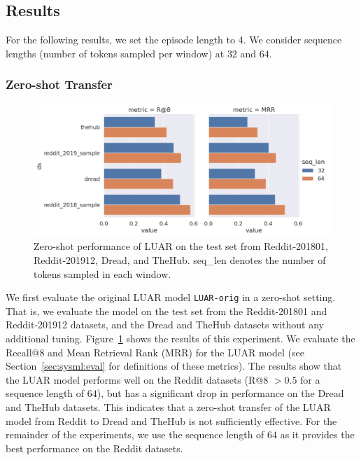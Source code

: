 \subsection{Results}

For the following results, we set the episode length to 4. We consider sequence lengths (number of tokens sampled per window) at $32$ and $64$.

\subsubsection{Zero-shot Transfer}
\begin{figure}
    \centering
    \includegraphics[width=0.9\linewidth]{stylometryExtensions/figures/results/rq1_zeroshot} 
    \caption{Zero-shot performance of LUAR on the test set from Reddit-201801, Reddit-201912, Dread, and TheHub. seq\_len denotes the number of tokens sampled in each window.}
    \label{fig:stylometry_extensions:followingTrail:results:rq1_zeroshot}   
\end{figure}
We first evaluate the original LUAR model \texttt{LUAR-orig} in a zero-shot setting.
That is, we evaluate the model on the test set from the Reddit-201801 and Reddit-201912 datasets, and the Dread and TheHub datasets without any additional tuning.
Figure~\ref{fig:stylometry_extensions:followingTrail:results:rq1_zeroshot} shows the results of this experiment.
We evaluate the Recall@8 and Mean Retrieval Rank (MRR) for the LUAR model (see Section~\ref{sec:sysml:eval} for definitions of these metrics).
The results show that the LUAR model performs well on the Reddit datasets (R@8 $>0.5$ for a sequence length of $64$), but has a significant drop in performance on the Dread and TheHub datasets.
This indicates that a zero-shot transfer of the LUAR model from Reddit to Dread and TheHub is not sufficiently effective.
For the remainder of the experiments, we use the sequence length of $64$ as it provides the best performance on the Reddit datasets.

